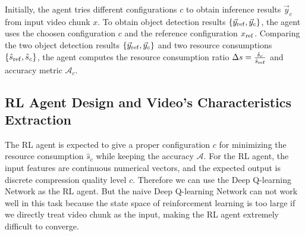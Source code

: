 Initially, the agent tries different configurations $ c $ to obtain inference results $\vec{y}_c$ from input video chunk $ x $. To obtain object detection results $ \{\vec{y}_{\rm ref}, \vec{y}_c\} $, the agent uses the choosen configuration $ c $ and the reference configuration $ x_{\rm ref} $. Comparing the two object detection results $ \{\vec{y}_{\rm ref}, \vec{y}_c\} $ and two resource consumptions $ \{\hat{s}_{\rm ref}, \hat{s}_c\} $, the agent computes the resource consumption ratio $ \Delta s = \frac{\hat{s}_c}{\hat{s}_{\rm ref}} $ and accuracy metric $ \mathcal{A}_c $.

\subsection{RL Agent Design and Video's Characteristics Extraction}

The RL agent is expected to give a proper configuration $ c $ for minimizing the resource consumption $ \hat{s}_c $ while keeping the accuracy $ \mathcal{A} $. For the RL agent, the input features are continuous numerical vectors, and the expected output is discrete compression quality level $ c $. Therefore we can use the Deep Q-learning Network \cite{DQN} as the RL agent. But the naive Deep Q-learning Network can not work well in this task because the state space of reinforcement learning is too large if we directly treat video chunk as the input, making the RL agent extremely difficult to converge.  


%

